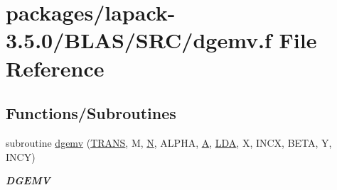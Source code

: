 \hypertarget{lapack-3_85_80_2BLAS_2SRC_2dgemv_8f}{}\section{packages/lapack-\/3.5.0/\+B\+L\+A\+S/\+S\+R\+C/dgemv.f File Reference}
\label{lapack-3_85_80_2BLAS_2SRC_2dgemv_8f}
\subsection*{Functions/\+Subroutines}
\begin{DoxyCompactItemize}
\item 
subroutine \hyperlink{group__double__blas__level2_gadd421a107a488d524859b4a64c1901a9}{dgemv} (\hyperlink{superlu__enum__consts_8h_a0c4e17b2d5cea33f9991ccc6a6678d62a1f61e3015bfe0f0c2c3fda4c5a0cdf58}{T\+R\+A\+N\+S}, M, \hyperlink{polmisc_8c_a0240ac851181b84ac374872dc5434ee4}{N}, A\+L\+P\+H\+A, \hyperlink{classA}{A}, \hyperlink{example__user_8c_ae946da542ce0db94dced19b2ecefd1aa}{L\+D\+A}, X, I\+N\+C\+X, B\+E\+T\+A, Y, I\+N\+C\+Y)
\begin{DoxyCompactList}\small\item\em {\bfseries D\+G\+E\+M\+V} \end{DoxyCompactList}\end{DoxyCompactItemize}
